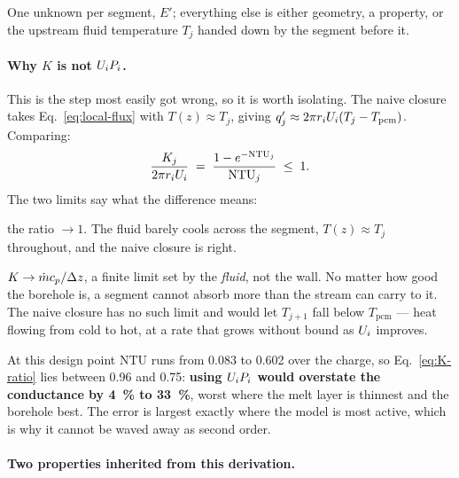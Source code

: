 One unknown per segment, $E'$; everything else is either geometry, a property,
or the upstream fluid temperature $T_{j}$ handed down by the segment before it.

\paragraph{Why $K$ is not $U_{i} P_{i}$.}
This is the step most easily got wrong, so it is worth isolating. The naive
closure takes Eq.~\eqref{eq:local-flux} with $T(z)\approx T_{j}$, giving
$q'_{j}\approx 2\pi r_{i}U_{i} (T_{j}-T_{\mathrm{pcm}})$. Comparing:
\begin{equation}
  \frac{K_{j}}{2\pi r_{i}U_{i}}
  \;=\;
  \frac{1-e^{-\mathrm{NTU}_{j}}}{\mathrm{NTU}_{j}}
  \;\le\; 1 .
  \label{eq:K-ratio}
\end{equation}
The two limits say what the difference means:

\begin{description}[leftmargin=1.9em,itemsep=3pt]
\item[$\mathrm{NTU}\to0$:] the ratio $\to1$. The fluid barely cools across the
  segment, $T(z)\approx T_{j}$ throughout, and the naive closure is right.
\item[$\mathrm{NTU}\to\infty$:] $K\to \dot m c_{p}/\Delta z$, a finite limit set
  by the \emph{fluid}, not the wall. No matter how good the borehole is, a
  segment cannot absorb more than the stream can carry to it. The naive closure
  has no such limit and would let $T_{j+1}$ fall below $T_{\mathrm{pcm}}$ ---
  heat flowing from cold to hot, at a rate that grows without bound as $U_{i}$
  improves.
\end{description}

\noindent
At this design point $\mathrm{NTU}$ runs from \num{0.083} to \num{0.602} over
the charge, so Eq.~\eqref{eq:K-ratio} lies between \num{0.96} and \num{0.75}:
\textbf{using $U_{i} P_{i}$ would overstate the conductance by \SI{4}{\percent}
to \SI{33}{\percent}}, worst where the melt layer is thinnest and the borehole
best. The error is largest exactly where the model is most active, which is why
it cannot be waved away as second order.

\paragraph{Two properties inherited from this derivation.}

